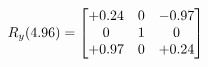 \documentclass[preview]{standalone}
\begin{document}
\begin{align*}
\special{dvisvgm:raw <g id='unique000'>}R_{y}(4.96) = \begin{bmatrix}+0.24 & 0 & -0.97 \\0 & 1 & 0 \\+0.97 & 0 & +0.24\end{bmatrix}\special{dvisvgm:raw </g>}
\end{align*}
\end{document}
